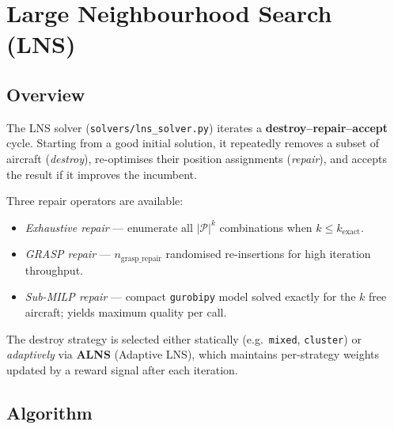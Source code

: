 \section{Large Neighbourhood Search (LNS)}
\label{sec:lns}

\subsection{Overview}

The LNS solver (\texttt{solvers/lns\_solver.py}) iterates a
\textbf{destroy–repair–accept} cycle.  Starting from a good initial solution,
it repeatedly removes a subset of aircraft (\emph{destroy}), re-optimises
their position assignments (\emph{repair}), and accepts the result if it
improves the incumbent.

Three repair operators are available:
\begin{itemize}[noitemsep]
    \item \emph{Exhaustive repair} — enumerate all $|\mathcal{P}|^k$
          combinations when $k \leq k_{\text{exact}}$.
    \item \emph{GRASP repair} — $n_{\text{grasp\_repair}}$ randomised
          re-insertions for high iteration throughput.
    \item \emph{Sub-MILP repair} — compact \texttt{gurobipy} model solved
          exactly for the $k$ free aircraft; yields maximum quality per call.
\end{itemize}

The destroy strategy is selected either statically (e.g.\ \texttt{mixed},
\texttt{cluster}) or \emph{adaptively} via \textbf{ALNS} (Adaptive LNS),
which maintains per-strategy weights updated by a reward signal after each
iteration.

\subsection{Algorithm}

